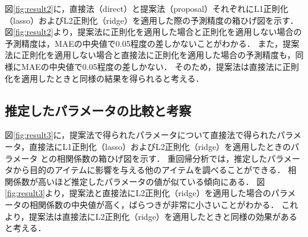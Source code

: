 図\ref{fig:result2}に，直接法（direct）と提案法（proposal）それぞれにL1正則化（lasso）およびL2正則化（ridge）を適用した際の予測精度の箱ひげ図を示す．
図\ref{fig:result2}より，提案法に正則化を適用した場合と正則化を適用しない場合の予測精度は，MAEの中央値で0.05程度の差しかないことがわかる．
また，提案法に正則化を適用しない場合と直接法に正則化を適用した場合の予測精度も，同様にMAEの中央値で0.05程度の差しかない．
そのため，提案法は直接法に正則化を適用したときと同様の結果を得られると考える．

\subsection{推定したパラメータの比較と考察}
図\ref{fig:result3}に，提案法で得られたパラメータについて直接法で得られたパラメータ，直接法にL1正則化（lasso）およびL2正則化（ridge）を適用したときのパラメータ
との相関係数の箱ひげ図を示す．
重回帰分析では，推定したパラメータから目的のアイテムに影響を与える他のアイテムを調べることができる．
相関係数が高いほど推定したパラメータの値が似ている傾向にある．
図\ref{fig:result3}より，提案法と直接法にL2正則化（ridge）を適用した場合のパラメータの相関係数の中央値が高く，ばらつきが非常に小さいことがわかる．
これより，提案法は直接法にL2正則化（ridge）を適用したときと同様の効果があると考える．